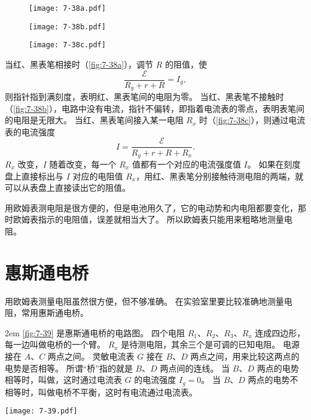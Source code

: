 \begin{figure}
  \begin{minipage}{0.32\linewidth}\centering
    \texttt{[image: 7-38a.pdf]}
    \subcaption{}\label{fig:7-38a}
  \end{minipage}
  \begin{minipage}{0.32\linewidth}\centering
    \texttt{[image: 7-38b.pdf]}
    \subcaption{}\label{fig:7-38b}
  \end{minipage}
  \begin{minipage}{0.32\linewidth}\centering
    \texttt{[image: 7-38c.pdf]}
    \subcaption{}\label{fig:7-38c}
  \end{minipage}
  \caption{}\label{fig:7-38}
\end{figure}

当红、黑表笔相接时（\cref{fig:7-38a}），调节 $R$ 的阻值，使
\[\frac{\mathcal{E}}{R_g+r+R}=I_g,\]
则指针指到满刻度，表明红、黑表笔间的电阻为零。
当红、黑表笔不接触时（\cref{fig:7-38b}），电路中没有电流，指针不偏转，即指着电流表的零点，表明表笔间的电阻是无限大。
当红、黑表笔间接入某一电阻 $R_x$ 时（\cref{fig:7-38c}），则通过电流表的电流强度
\[I=\frac{\mathcal{E}}{R_g+r+R+R_x}.\]
$R_x$ 改变，$I$ 随着改变，每一个 $R_x$ 值都有一个对应的电流强度值 $I$。
如果在刻度盘上直接标出与 $I$ 对应的电阻值 $R_x$，用红、黑表笔分别接触待测电阻的两端，就可以从表盘上直接读出它的阻值。

用欧姆表测电阻是很方便的，但是电池用久了，它的电动势和内电阻都要变化，那时欧姆表指示的电阻值，误差就相当大了。
所以欧姆表只能用来粗略地测量电阻。

\section{惠斯通电桥}
用欧姆表测量电阻虽然很方便，但不够准确。
在实验室里要比较准确地测量电阻，常用惠斯通电桥。

\medskip\noindent
\begin{minipage}{0.6\linewidth}\parindent2em
\cref{fig:7-39} 是惠斯通电桥的电路图。
四个电阻 $R_1$、$R_2$、$R_3$、$R_x$ 连成四边形，每一边叫做电桥的一个臂。
$R_x$ 是待测电阻，其余三个是可调的已知电阻。
电源接在 $A$、$C$ 两点之间。
灵敏电流表 $G$ 接在 $B$、$D$ 两点之间，用来比较这两点的电势是否相等。
所谓“桥”指的就是 $B$、$D$ 两点间的连线。
当 $B$、$D$ 两点的电势相等时，叫做，这时通过电流表 $G$ 的电流强度 $I_g=0$。
当 $B$、$D$ 两点的电势不相等时，叫做电桥不平衡，这时有电流通过电流表。
\end{minipage}\hfill
\begin{minipage}{0.37\linewidth}\centering
  \begin{figurehere}
    \texttt{[image: 7-39.pdf]}
    \caption{}\label{fig:7-39}
  \end{figurehere}
\end{minipage}

